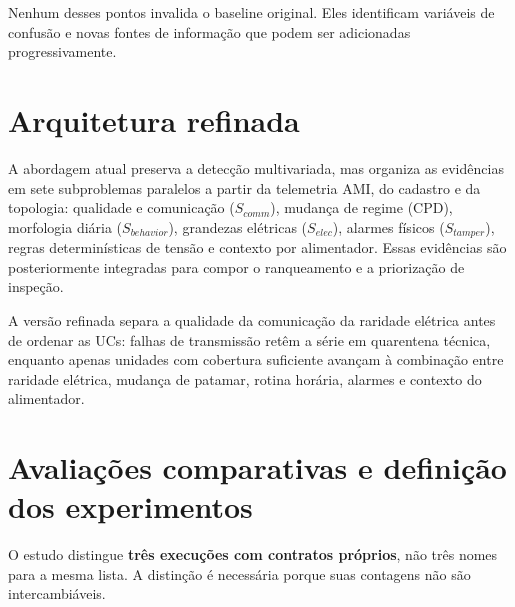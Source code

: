 Nenhum desses pontos invalida o baseline original. Eles identificam variáveis de confusão e novas fontes de informação que podem ser adicionadas progressivamente.

\section{Arquitetura refinada}\label{arquitetura-refinada}

A abordagem atual preserva a detecção multivariada, mas organiza as evidências em sete subproblemas paralelos a partir da telemetria AMI, do cadastro e da topologia: qualidade e comunicação ($S_{comm}$), mudança de regime (CPD), morfologia diária ($S_{behavior}$), grandezas elétricas ($S_{elec}$), alarmes físicos ($S_{tamper}$), regras determinísticas de tensão e contexto por alimentador. Essas evidências são posteriormente integradas para compor o ranqueamento e a priorização de inspeção.

A versão refinada separa a qualidade da comunicação da raridade elétrica antes de ordenar as UCs: falhas de transmissão retêm a série em quarentena técnica, enquanto apenas unidades com cobertura suficiente avançam à combinação entre raridade elétrica, mudança de patamar, rotina horária, alarmes e contexto do alimentador.

\section{Avaliações comparativas e definição dos experimentos}\label{desenho-de-ablauxe7uxe3o}

O estudo distingue \textbf{três execuções com contratos próprios}, não três nomes para a mesma lista. A distinção é necessária porque suas contagens não são intercambiáveis.

